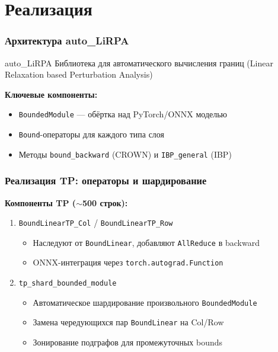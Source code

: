 
\section{Реализация}

\begin{frame}
\frametitle{Архитектура auto\_LiRPA}

\begin{block}{auto\_LiRPA}
Библиотека для автоматического вычисления границ (Linear Relaxation based Perturbation Analysis)
\end{block}

\vspace{0.3cm}

\textbf{Ключевые компоненты:}
\begin{itemize}
    \item \texttt{BoundedModule} --- обёртка над PyTorch/ONNX моделью
    \item \texttt{Bound}-операторы для каждого типа слоя
    \item Методы \texttt{bound\_backward} (CROWN) и \texttt{IBP\_general} (IBP)
\end{itemize}

\end{frame}

\begin{frame}
\frametitle{Реализация TP: операторы и шардирование}

\textbf{Компоненты TP ($\sim$500 строк):}

\begin{enumerate}
    \item \texttt{BoundLinearTP\_Col} / \texttt{BoundLinearTP\_Row}
    \begin{itemize}
        \item Наследуют от \texttt{BoundLinear}, добавляют \texttt{AllReduce} в backward
        \item ONNX-интеграция через \texttt{torch.autograd.Function}
    \end{itemize}

    \item \texttt{tp\_shard\_bounded\_module}
    \begin{itemize}
        \item Автоматическое шардирование произвольного \texttt{BoundedModule}
        \item Замена чередующихся пар \texttt{BoundLinear} на Col/Row
        \item Зонирование подграфов для промежуточных bounds
    \end{itemize}
\end{enumerate}

\end{frame}

